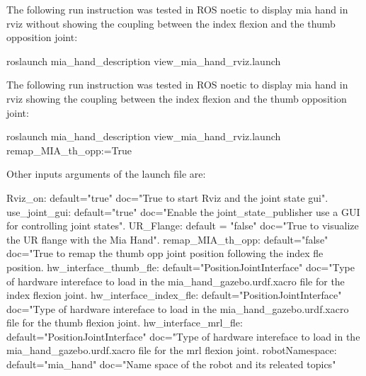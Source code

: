 The following run instruction was tested in R\+OS noetic to display mia hand in rviz without showing the coupling between the index flexion and the thumb opposition joint\+: \begin{DoxyVerb}roslaunch mia_hand_description view_mia_hand_rviz.launch
\end{DoxyVerb}


The following run instruction was tested in R\+OS noetic to display mia hand in rviz showing the coupling between the index flexion and the thumb opposition joint\+: \begin{DoxyVerb}roslaunch mia_hand_description view_mia_hand_rviz.launch remap_MIA_th_opp:=True
\end{DoxyVerb}


Other inputs arguments of the launch file are\+: \begin{DoxyVerb}Rviz_on:                default="true"                   doc="True to start Rviz and the joint state gui".
use_joint_gui:          default="true"                   doc="Enable the joint_state_publisher use a GUI for controlling joint states".
UR_Flange:              default = "false"                doc="True to visualize the UR flange with the Mia Hand".
remap_MIA_th_opp:       default="false"                  doc="True to remap the thumb opp joint position following the index fle position.
hw_interface_thumb_fle: default="PositionJointInterface" doc="Type of hardware intereface to load in the mia_hand_gazebo.urdf.xacro file for the index flexion joint.
hw_interface_index_fle: default="PositionJointInterface" doc="Type of hardware intereface to load in the mia_hand_gazebo.urdf.xacro file for the thumb flexion joint.
hw_interface_mrl_fle:   default="PositionJointInterface" doc="Type of hardware intereface to load in the mia_hand_gazebo.urdf.xacro file for the mrl flexion joint.
robotNamespace:         default="mia_hand"               doc="Name space of the robot and its releated topics"
\end{DoxyVerb}
 